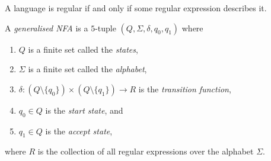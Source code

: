 \documentclass{article}
\begin{document}
\begin{theorem}[Sipser p. 66]
    A language is regular if and only if some regular expression describes it. 
\end{theorem}

\begin{definition}
    A \emph{generalised NFA} is a $5$-tuple $(Q,\Sigma,\delta,q_0,q_1)$ where 
    \begin{enumerate}
        \item $Q$ is a finite set called the \emph{states},
        \item $\Sigma$ is a finite set called the \emph{alphabet},
        \item $\delta:(Q\setminus\{q_0\})\times(Q\setminus\{q_1\})\to R$ is the \emph{transition function},
        \item $q_0\in Q$ is the \emph{start state}, and 
        \item $q_1\in Q$ is the \emph{accept state},
    \end{enumerate} 
    where $R$ is the collection of all regular expressions over the alphabet $\Sigma$.
\end{definition}
\end{document}
